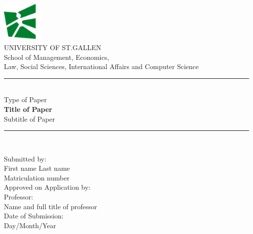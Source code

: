 \documentclass[11pt,a4paper]{report}
\begin{document}
\begin{titlepage}
    \centering
    \includegraphics[width=2cm,height=2.1cm]{images/university_logo.png}\\[0.7cm]
    
    {\fontsize{18}{22}\selectfont UNIVERSITY OF ST.GALLEN}\\[0.5cm]
    {\fontsize{11}{13}\selectfont School of Management, Economics,\\
    Law, Social Sciences, International Affairs and Computer Science}\\[4cm]
    
    \rule{\linewidth}{0.3mm} \\[0.4cm]
    {\fontsize{16}{18}\selectfont Type of Paper}\\[0.4cm]
    {\fontsize{20}{24}\bfseries Title of Paper}\\[0.4cm]
    {\fontsize{16}{18}\selectfont Subtitle of Paper}\\[0.3cm]
    \rule{\linewidth}{0.3mm} \\[2.5cm]
    
    \begin{center}
        {\fontsize{12}{14}\selectfont Submitted by:} \\
        {\fontsize{12}{14}\selectfont First name Last name} \\
        {\fontsize{12}{14}\selectfont Matriculation number} \\[1cm]

    
        {\fontsize{12}{14}\selectfont Approved on Application by:} \\[0.2cm]
        {\fontsize{12}{14}\selectfont Professor: \\Name and full title of professor} \\[1.5cm]
    
        {\fontsize{12}{14}\selectfont Date of Submission:} \\[0.2cm]
        {\fontsize{12}{14}\selectfont Day/Month/Year}
    \end{center}
    
\end{titlepage}
\end{document}
